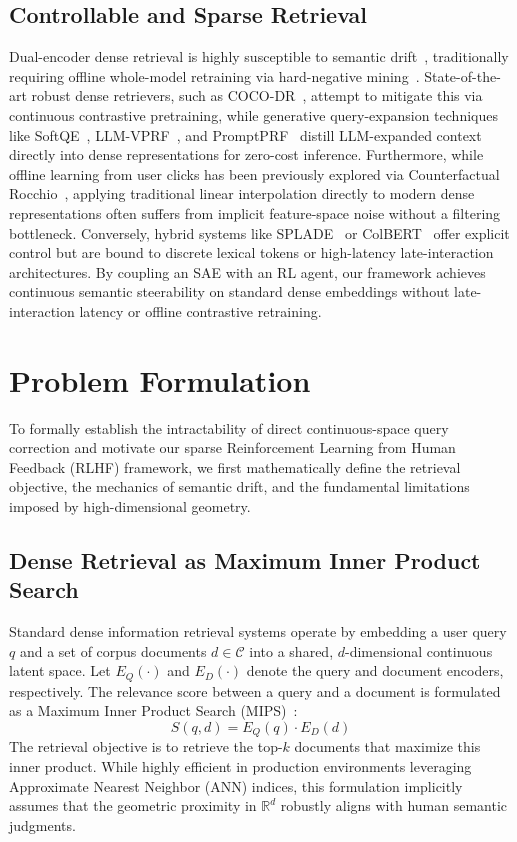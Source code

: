 \subsection{Controllable and Sparse Retrieval}
Dual-encoder dense retrieval is highly susceptible to semantic drift~\citep{zhan2021}, traditionally requiring offline whole-model retraining via hard-negative mining~\citep{xiong2021}. State-of-the-art robust dense retrievers, such as COCO-DR~\citep{yu2022cocodr}, attempt to mitigate this via continuous contrastive pretraining, while generative query-expansion techniques like SoftQE~\citep{zheng2024softqe}, LLM-VPRF~\citep{2504.01448}, and PromptPRF~\citep{2503.14887} distill LLM-expanded context directly into dense representations for zero-cost inference. Furthermore, while offline learning from user clicks has been previously explored via Counterfactual Rocchio~\citep{2204.00718}, applying traditional linear interpolation directly to modern dense representations often suffers from implicit feature-space noise without a filtering bottleneck. Conversely, hybrid systems like SPLADE~\citep{formal2021splade} or ColBERT~\citep{khattab2020} offer explicit control but are bound to discrete lexical tokens or high-latency late-interaction architectures. By coupling an SAE with an RL agent, our framework achieves continuous semantic steerability on standard dense embeddings without late-interaction latency or offline contrastive retraining.

\section{Problem Formulation}
To formally establish the intractability of direct continuous-space query correction and motivate our sparse Reinforcement Learning from Human Feedback (RLHF) framework, we first mathematically define the retrieval objective, the mechanics of semantic drift, and the fundamental limitations imposed by high-dimensional geometry.

\subsection{Dense Retrieval as Maximum Inner Product Search}
Standard dense information retrieval systems operate by embedding a user query $q$ and a set of corpus documents $d \in \mathcal{C}$ into a shared, $d$-dimensional continuous latent space. Let $E_Q(\cdot)$ and $E_D(\cdot)$ denote the query and document encoders, respectively. The relevance score between a query and a document is formulated as a Maximum Inner Product Search (MIPS)~\citep{johnson2019, shrivastava2014}:
\begin{equation}
S(q,d) = E_Q(q) \cdot E_D(d)
\end{equation}
The retrieval objective is to retrieve the top-$k$ documents that maximize this inner product. While highly efficient in production environments leveraging Approximate Nearest Neighbor (ANN) indices, this formulation implicitly assumes that the geometric proximity in $\mathbb{R}^d$ robustly aligns with human semantic judgments.

